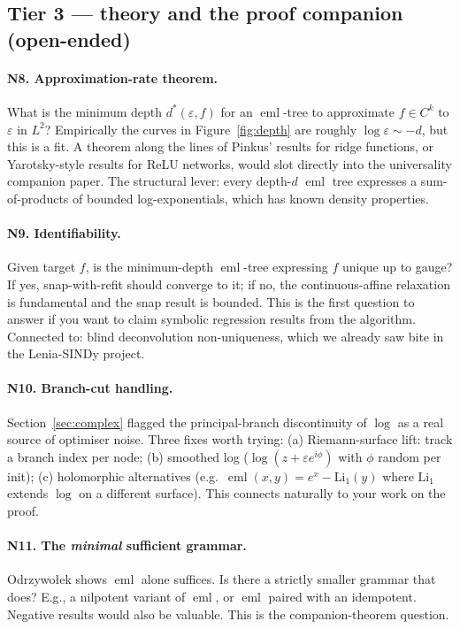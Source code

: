 \documentclass[11pt]{article}
\newcommand{\eml}{\operatorname{eml}}
\begin{document}
\subsection{Tier 3 — theory and the proof companion (open-ended)}

\paragraph{N8. Approximation-rate theorem.}
What is the minimum depth $d^*(\varepsilon, f)$ for an $\eml$-tree to
approximate $f \in C^k$ to $\varepsilon$ in $L^2$? Empirically the curves
in Figure~\ref{fig:depth} are roughly $\log \varepsilon \sim -d$, but this
is a fit. A theorem along the lines of Pinkus' results for ridge functions,
or Yarotsky-style results for ReLU networks, would slot directly into the
universality companion paper. The structural lever: every depth-$d$ $\eml$
tree expresses a sum-of-products of bounded log-exponentials, which has
known density properties.

\paragraph{N9. Identifiability.}
Given target $f$, is the minimum-depth $\eml$-tree expressing $f$ unique
up to gauge? If yes, snap-with-refit should converge to it; if no, the
continuous-affine relaxation is fundamental and the snap result is bounded.
This is the first question to answer if you want to claim symbolic regression
results from the algorithm. Connected to: blind deconvolution non-uniqueness,
which we already saw bite in the Lenia-SINDy project.

\paragraph{N10. Branch-cut handling.}
Section~\ref{sec:complex} flagged the principal-branch discontinuity of
$\log$ as a real source of optimiser noise. Three fixes worth trying:
(a) Riemann-surface lift: track a branch index per node; (b) smoothed log
($\log(z + \varepsilon e^{i\phi})$ with $\phi$ random per init); (c)
holomorphic alternatives (e.g.\ $\eml(x, y) = e^x - \mathrm{Li}_1(y)$ where
$\mathrm{Li}_1$ extends $\log$ on a different surface). This connects
naturally to your work on the proof.

\paragraph{N11. The \emph{minimal} sufficient grammar.}
Odrzywo\l{}ek shows $\eml$ alone suffices. Is there a strictly smaller
grammar that does? E.g., a nilpotent variant of $\eml$, or $\eml$ paired
with an idempotent. Negative results would also be valuable. This is the
companion-theorem question.
\end{document}

